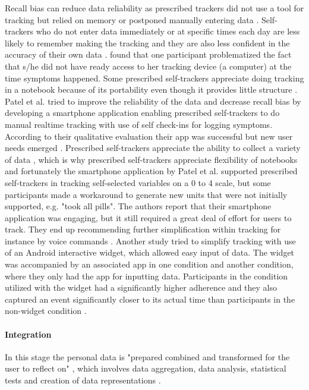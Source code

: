 Recall bias can reduce data reliability as prescribed trackers did not use a tool for tracking but relied on memory \citep{Patel2012} or postponed manually entering data \citep{MacLeod2014}. Self-trackers who do not enter data immediately or at specific times each day are less likely to remember making the tracking and they are also less confident in the accuracy of their own data \citep{MacLeod2014}. \citep{Li2010} found that one participant problematized the fact that s/he did not have ready access to her tracking device (a computer) at the time symptoms happened. Some prescribed self-trackers appreciate doing tracking in a notebook because of its portability even though it provides little structure \citep{MacLeod2014}. Patel et al. tried to improve the reliability of the data and decrease recall bias by developing a smartphone application enabling prescribed self-trackers to do manual realtime tracking with use of self check-ins for logging symptoms. According to their qualitative evaluation their app was successful but new user needs emerged \citep{Patel2012}. Prescribed self-trackers appreciate the ability to collect a variety of data \citep{MacLeod2014, Patel2012}, which is why prescribed self-trackers appreciate flexibility of notebooks \citep{MacLeod2014} and fortunately the smartphone application by Patel et al. supported prescribed self-trackers in tracking self-selected variables on a 0 to 4 scale, but some participants made a workaround to generate new units that were not initially supported, e.g. "took all pills". The authors report that their smartphone application was engaging, but it still required a great deal of effort for users to track. They end up recommending further simplification within tracking for instance by voice commands \citep{Patel2012}. Another study tried to simplify tracking with use of an Android interactive widget, which allowed easy input of data. The widget was accompanied by an associated app in one condition and another condition, where they only had the app for inputting data. Participants in the condition utilized with the widget had a significantly higher adherence and they also captured an event significantly closer to its actual time than participants in the non-widget condition \citep{Choe2015}. 

\paragraph{Integration}
In this stage the personal data is "prepared combined and transformed for the user to reflect on" \citep{Li2010}, which involves data aggregation, data analysis, statistical tests and creation of data representations \citep{Li2010}. 

